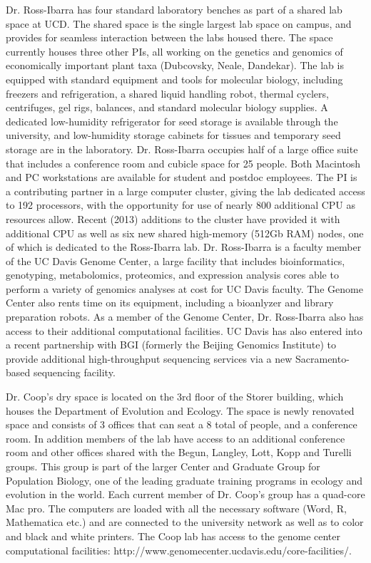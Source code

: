 Dr. Ross-Ibarra has four standard laboratory benches as part of a shared lab space at UCD.  The shared space is the single largest lab space on campus, and provides for seamless interaction between the labs housed there.  The space currently houses three other PIs, all working on the genetics and genomics of economically important plant taxa (Dubcovsky, Neale, Dandekar). The lab is equipped with standard equipment and tools for molecular biology, including freezers and refrigeration, a shared liquid handling robot, thermal cyclers, centrifuges, gel rigs, balances, and standard molecular biology supplies.  A dedicated low-humidity refrigerator for seed storage is available through the university, and low-humidity storage cabinets for tissues and temporary seed storage are in the laboratory. Dr. Ross-Ibarra occupies half of a large office suite that includes a conference room and cubicle space for 25 people.  Both Macintosh and PC workstations are available for student and postdoc employees. The PI is a contributing partner in a large computer cluster, giving the lab dedicated access to 192 processors, with the opportunity for use of nearly 800 additional CPU as resources allow. Recent (2013) additions to the cluster have provided it with additional CPU as well as six new shared high-memory (512Gb RAM) nodes, one of which is dedicated to the Ross-Ibarra lab. Dr. Ross-Ibarra is a faculty member of the UC Davis Genome Center, a large facility that includes bioinformatics, genotyping, metabolomics, proteomics, and expression analysis cores able to perform a variety of genomics analyses at cost for UC Davis faculty. The Genome Center also rents time on its equipment, including a bioanlyzer and library preparation robots. As a member of the Genome Center, Dr. Ross-Ibarra also has access to their additional computational facilities. UC Davis has also entered into a recent partnership with BGI (formerly the Beijing Genomics Institute) to provide additional high-throughput sequencing services via a new Sacramento-based sequencing facility.

Dr. Coop's dry space is located on the 3rd floor of the Storer building, which houses the Department of Evolution and Ecology. The space is newly renovated space and consists of 3 offices that can seat a 8 total of people, and a conference room. In addition members of the lab have access to an additional conference room and other offices shared with the Begun, Langley, Lott, Kopp and Turelli groups. This group is part of the larger Center and Graduate Group for Population Biology, one of the leading graduate training programs in ecology and evolution in the world. Each current member of Dr. Coop’s group has a quad-core Mac pro. The computers are loaded with all the necessary software (Word, R, Mathematica etc.) and are connected to the university network as well as to color and black and white printers. The Coop lab has access to the genome center computational facilities: http://www.genomecenter.ucdavis.edu/core-facilities/. 

